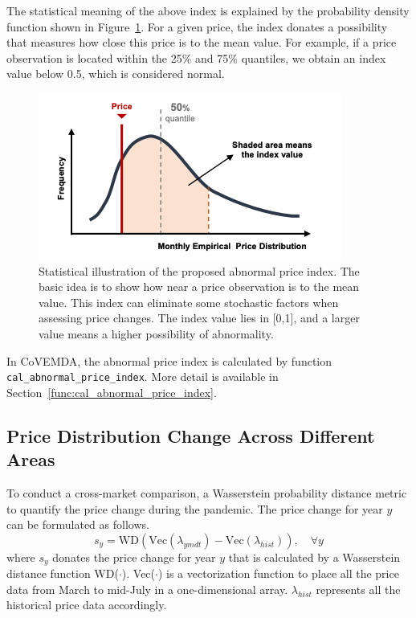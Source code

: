 \documentclass[10pt]{article}
\newcommand{\covemda}{CoVEMDA}
\numberwithin{equation}{section}
\numberwithin{table}{section}
\numberwithin{figure}{section}
\begin{document}
The statistical meaning of the above index is explained by the probability density function shown in Figure~\ref{fig:abnormal_price_index}. For a given price, the index donates a possibility that measures how close this price is to the mean value. For example, if a price observation is located within the 25\% and 75\% quantiles, we obtain an index value below 0.5, which is considered normal.
\begin{figure}
  \centering
  \includegraphics[width=.8\textwidth]{figures/abnormal_price_index.png}
  \caption{Statistical illustration of the proposed abnormal price index. The basic idea is to show how near a price observation is to the mean value. This index can eliminate some stochastic factors when assessing price changes. The index value lies in [0,1], and a larger value means a higher possibility of abnormality.}
  \label{fig:abnormal_price_index}
\end{figure}

In \covemda{}, the abnormal price index is calculated by function \verb!cal_abnormal_price_index!. More detail is available in Section~\ref{func:cal_abnormal_price_index}.

\subsection{Price Distribution Change Across Different Areas}\label{subsec:cal_distribution_diff}

To conduct a cross-market comparison, a Wasserstein probability distance \cite{carrillo2004wasserstein}\cite{kantorovich2006translocation} metric to quantify the price change during the pandemic. The price change for year $y$ can be formulated as follows.
\begin{equation*}
    s_y=\text{WD}(\text{Vec}(\lambda_{ymdt})-\text{Vec}(\lambda_{hist})),\quad\forall y    
\end{equation*}
where $s_y$ donates the price change for year $y$ that is calculated by a Wasserstein distance function WD($\cdot$). Vec($\cdot$) is a vectorization function to place all the price data from March to mid-July in a one-dimensional array. $\lambda_{hist}$ represents all the historical price data accordingly.
\end{document}
